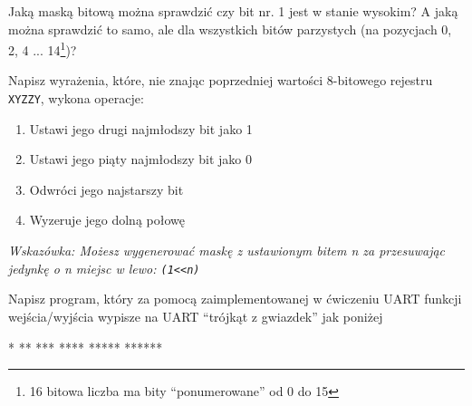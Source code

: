 \dbEntryCheckResults
  Jaką maską bitową można sprawdzić czy bit nr. 1 jest w stanie wysokim? A jaką można sprawdzić to samo, ale
  dla wszystkich bitów parzystych (na pozycjach 0, 2, 4 ... 14\footnote{16 bitowa liczba ma bity ``ponumerowane'' od 0 do 15})?
\fi

\dbEntryCheckResults
  Napisz wyrażenia, które, nie znając poprzedniej wartości 8-bitowego rejestru \Verb$XYZZY$, wykona operacje:
  \begin{enumerate}
  \item Ustawi jego drugi najmłodszy bit jako 1
  \item Ustawi jego piąty najmłodszy bit jako 0
  \item Odwróci jego najstarszy bit
  \item Wyzeruje jego dolną połowę
  \end{enumerate}
  \textit{Wskazówka: Możesz wygenerować maskę z ustawionym bitem n za przesuwając jedynkę o n miejsc w lewo: \Verb$(1<<n)$}
\fi

\dbEntryCheckResults
Napisz program, który za pomocą zaimplementowanej w ćwiczeniu UART funkcji wejścia/wyjścia wypisze na UART
``trójkąt z gwiazdek'' jak poniżej

\begin{CodeFrame*}[text]{}
*
**
***
****
*****
******
\end{CodeFrame*}
\fi
